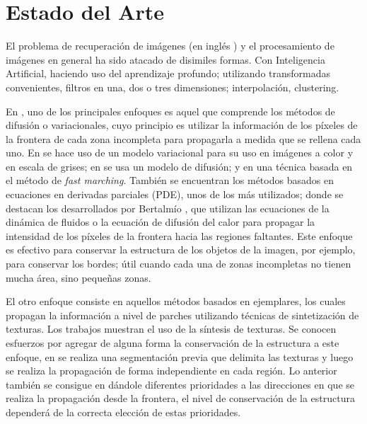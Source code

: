 \section*{Estado del Arte}

El problema de recuperaci\'on de im\'agenes (en ingl\'es \II) y el procesamiento de imágenes en general ha sido atacado de disimiles formas. Con Inteligencia Artificial, haciendo uso del aprendizaje profundo; utilizando transformadas convenientes, filtros en una, dos o tres dimensiones; interpolaci\'on, clustering.

En \II, uno de los principales enfoques es aquel que comprende los m\'etodos de difusión o variacionales, cuyo principio es utilizar la informaci\'on de los p\'ixeles de la frontera de cada zona incompleta para propagarla a medida que se rellena cada uno. En \cite{ballester2001variational} se hace uso de un modelo variacional para su uso en im\'agenes a color y en escala de grises; en \cite{chan2001nontexture} se usa un modelo de difusión; y en \cite{telea2004image} una t\'ecnica basada en el m\'etodo de \textit{fast marching}. También se encuentran los métodos basados en ecuaciones en derivadas parciales (PDE), unos de los m\'as utilizados; donde se destacan los desarrollados por Bertalmío \cite{bertalmio2001navier,bertalmio2000image}, que utilizan las ecuaciones de la dinámica de fluidos o la ecuación de difusión del calor para propagar la intensidad de los píxeles de la frontera hacia las regiones faltantes. Este enfoque es efectivo para conservar la estructura de los objetos de la imagen, por ejemplo, para conservar los bordes; \'util cuando cada una de zonas incompletas no tienen mucha área, sino pequeñas zonas.

El otro enfoque consiste en aquellos m\'etodos basados en ejemplares, los cuales propagan la informaci\'on a nivel de parches utilizando t\'ecnicas de sintetizaci\'on de texturas. Los trabajos \cite{ashikhmin2001synthesizing,garber1981computational,liang2001real} muestran el uso de la s\'intesis de texturas. Se conocen esfuerzos por agregar de alguna forma la conservaci\'on de la estructura a este enfoque, en \cite{li2014image} se realiza una segmentaci\'on previa que delimita las texturas y luego se realiza la propagaci\'on de forma independiente en cada regi\'on. Lo anterior tambi\'en se consigue en \cite{criminisi2003object, wang2011image} d\'andole diferentes prioridades a las direcciones en que se realiza la propagaci\'on desde la frontera, el nivel de conservaci\'on de la estructura depender\'a de la correcta elecci\'on de estas prioridades.


